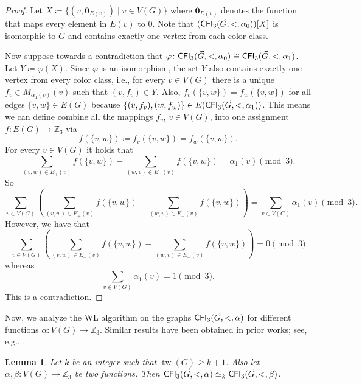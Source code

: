 \PassOptionsToPackage{dvipsnames,svgnames}{xcolor}\documentclass[10pt,a4paper]{article}
\newtheorem{lemma}{Lemma}[section]
\newcommand{\ZZ}{{\mathbb Z}}
\DeclareMathOperator{\tw}{tw}
\newcommand{\CFI}{{\sf CFI}}
\begin{document}
\begin{proof}
 Let $X \coloneqq \{(v,\mathbf{0}_{E(v)}) \mid v \in V(G)\}$ where $\mathbf{0}_{E(v)}$ denotes the function that maps every element in $E(v)$ to $0$.
 Note that $(\CFI_3(\vec{G},<,\alpha_0))[X]$ is isomorphic to $G$ and contains exactly one vertex from each color class.

 Now suppose towards a contradiction that $\varphi\colon\CFI_3(\vec{G},<,\alpha_0) \cong \CFI_3(\vec{G},<,\alpha_1)$.
 Let $Y \coloneqq \varphi(X)$.
 Since $\varphi$ is an isomorphism, the set $Y$ also contains exactly one vertex from every color class, i.e., for every $v \in V(G)$ there is a unique $f_v \in M_{\alpha_1(v)}(v)$ such that $(v,f_v) \in Y$.
 Also, $f_v(\{v,w\}) = f_w(\{v,w\})$ for all edges $\{v,w\} \in E(G)$ because $\{(v,f_v),(w,f_w)\} \in E(\CFI_3(\vec{G},<,\alpha_1))$.
 This means we can define combine all the mappings $f_v$, $v \in V(G)$, into one assignment $f \colon E(G) \to \ZZ_3$ via
 \[f(\{v,w\}) \coloneqq f_v(\{v,w\}) = f_w(\{v,w\}).\]
 For every $v \in V(G)$ it holds that
 \[\sum_{(v,w) \in E_+(v)} f(\{v,w\}) - \sum_{(w,v) \in E_-(v)} f(\{v,w\}) = \alpha_1(v) \pmod{3}.\]
 So
 \[\sum_{v \in V(G)} \left(\sum_{(v,w) \in E_+(v)} f(\{v,w\}) - \sum_{(w,v) \in E_-(v)} f(\{v,w\})\right) = \sum_{v \in V(G)}\alpha_1(v) \pmod{3}.\]
 However, we have that
 \[\sum_{v \in V(G)} \left(\sum_{(v,w) \in E_+(v)} f(\{v,w\}) - \sum_{(w,v) \in E_-(v)} f(\{v,w\})\right) = 0 \pmod{3}\]
 whereas
 \[\sum_{v \in V(G)}\alpha_1(v) = 1 \pmod{3}.\]
 This is a contradiction.
\end{proof}

Now, we analyze the WL algorithm on the graphs $\CFI_3(\vec{G},<,\alpha)$ for different functions $\alpha\colon V(G) \to \ZZ_3$.
Similar results have been obtained in prior works; see, e.g., \cite{DawarR07,Neuen24}.

\begin{lemma}
 \label{lem:cfi-indistinguishable}
 Let $k$ be an integer such that $\tw(G) \geq k+1$.
 Also let $\alpha,\beta\colon V(G) \to \ZZ_3$ be two functions.
 Then $\CFI_3(\vec{G},<,\alpha) \simeq_k \CFI_3(\vec{G},<,\beta)$.
\end{lemma}
\end{document}
